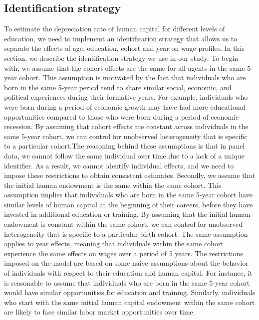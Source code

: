 \documentclass[14pt]{sistedes}
\begin{document}
\subsection{Identification strategy}
To estimate the depreciation rate of human capital for different levels of education, we need to implement an identification strategy that allows us to separate the effects of age, education, cohort and year on wage profiles. In this section, we describe the identification strategy we use in our study.
\newline
To begin with, we assume that the cohort effects are the same for all agents in the same 5-year cohort. This assumption is motivated by the fact that individuals who are born in the same 5-year period tend to share similar social, economic, and political experiences during their formative years. For example, individuals who were born during a period of economic growth may have had more educational opportunities compared to those who were born during a period of economic recession. By assuming that cohort effects are constant across individuals in the same 5-year cohort, we can control for unobserved heterogeneity that is specific to a particular cohort.The reasoning behind these assumptions is that in panel data, we cannot follow the same individual over time due to a lack of a unique identifier. As a result, we cannot identify individual effects, and we need to impose these restrictions to obtain consistent estimates.
\newline
Secondly, we assume that the initial human endowment is the same within the same cohort. This assumption implies that individuals who are born in the same 5-year cohort have similar levels of human capital at the beginning of their careers, before they have invested in additional education or training. By assuming that the initial human endowment is constant within the same cohort, we can control for unobserved heterogeneity that is specific to a particular birth cohort.
\newline
The same assumption applies to year effects, meaning that individuals within the same cohort experience the same effects on wages over a period of 5 years.
\newline
The restrictions imposed on the model are based on some naive assumptions about the behavior of individuals with respect to their education and human capital. For instance, it is reasonable to assume that individuals who are born in the same 5-year cohort would have similar opportunities for education and training. Similarly, individuals who start with the same initial human capital endowment within the same cohort are likely to face similar labor market opportunities over time.\newline
\end{document}
